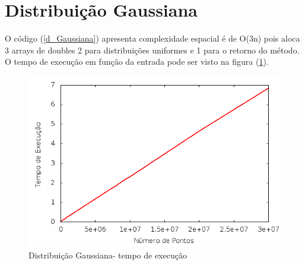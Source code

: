 \section{Distribuição Gaussiana}
O código (\ref{d_Gaussiana}) apresenta complexidade espacial é de O(3n) pois aloca 3 arrays de doubles 2 para distribuições uniformes e 1 para o retorno do método. O tempo de execução em função da entrada pode ser visto na figura (\ref{TempExecGau}).
\begin{figure}[!htb]
\centering
\begin{minipage}[b]{0.45\linewidth}
\includegraphics[width=\linewidth]{./img/AspectosNumericos/GauComplexidade.png}
\caption{Distribuição  Gaussiana- tempo de execução}
\label{TempExecGau}
\end{minipage} \hfill
\end{figure}

